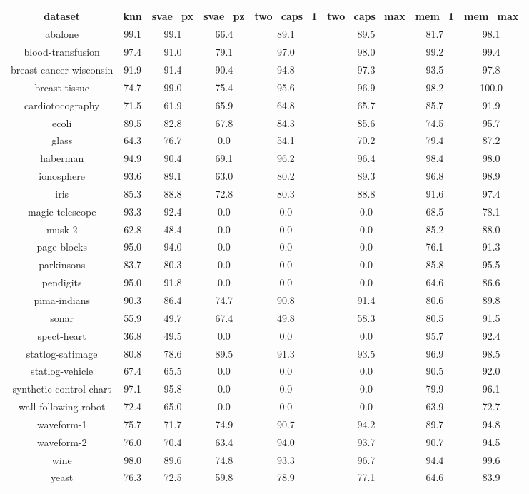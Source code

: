 \begin{table} 
 \center 
 \begin{tabular}[h]{c c c c c c c c } 
  dataset & knn & svae_px & svae_pz & two_caps_1 & two_caps_max & mem_1 & mem_max  \\ 
  \hline 
  abalone & 99.1 & 99.1 & 66.4 & 89.1 & 89.5 & 81.7 & 98.1  \\ 
  blood-transfusion & 97.4 & 91.0 & 79.1 & 97.0 & 98.0 & 99.2 & 99.4  \\ 
  breast-cancer-wisconsin & 91.9 & 91.4 & 90.4 & 94.8 & 97.3 & 93.5 & 97.8  \\ 
  breast-tissue & 74.7 & 99.0 & 75.4 & 95.6 & 96.9 & 98.2 & 100.0  \\ 
  cardiotocography & 71.5 & 61.9 & 65.9 & 64.8 & 65.7 & 85.7 & 91.9  \\ 
  ecoli & 89.5 & 82.8 & 67.8 & 84.3 & 85.6 & 74.5 & 95.7  \\ 
  glass & 64.3 & 76.7 & 0.0 & 54.1 & 70.2 & 79.4 & 87.2  \\ 
  haberman & 94.9 & 90.4 & 69.1 & 96.2 & 96.4 & 98.4 & 98.0  \\ 
  ionosphere & 93.6 & 89.1 & 63.0 & 80.2 & 89.3 & 96.8 & 98.9  \\ 
  iris & 85.3 & 88.8 & 72.8 & 80.3 & 88.8 & 91.6 & 97.4  \\ 
  magic-telescope & 93.3 & 92.4 & 0.0 & 0.0 & 0.0 & 68.5 & 78.1  \\ 
  musk-2 & 62.8 & 48.4 & 0.0 & 0.0 & 0.0 & 85.2 & 88.0  \\ 
  page-blocks & 95.0 & 94.0 & 0.0 & 0.0 & 0.0 & 76.1 & 91.3  \\ 
  parkinsons & 83.7 & 80.3 & 0.0 & 0.0 & 0.0 & 85.8 & 95.5  \\ 
  pendigits & 95.0 & 91.8 & 0.0 & 0.0 & 0.0 & 64.6 & 86.6  \\ 
  pima-indians & 90.3 & 86.4 & 74.7 & 90.8 & 91.4 & 80.6 & 89.8  \\ 
  sonar & 55.9 & 49.7 & 67.4 & 49.8 & 58.3 & 80.5 & 91.5  \\ 
  spect-heart & 36.8 & 49.5 & 0.0 & 0.0 & 0.0 & 95.7 & 92.4  \\ 
  statlog-satimage & 80.8 & 78.6 & 89.5 & 91.3 & 93.5 & 96.9 & 98.5  \\ 
  statlog-vehicle & 67.4 & 65.5 & 0.0 & 0.0 & 0.0 & 90.5 & 92.0  \\ 
  synthetic-control-chart & 97.1 & 95.8 & 0.0 & 0.0 & 0.0 & 79.9 & 96.1  \\ 
  wall-following-robot & 72.4 & 65.0 & 0.0 & 0.0 & 0.0 & 63.9 & 72.7  \\ 
  waveform-1 & 75.7 & 71.7 & 74.9 & 90.7 & 94.2 & 89.7 & 94.8  \\ 
  waveform-2 & 76.0 & 70.4 & 63.4 & 94.0 & 93.7 & 90.7 & 94.5  \\ 
  wine & 98.0 & 89.6 & 74.8 & 93.3 & 96.7 & 94.4 & 99.6  \\ 
  yeast & 76.3 & 72.5 & 59.8 & 78.9 & 77.1 & 64.6 & 83.9  \\ 
 \end{tabular}
\end{table}